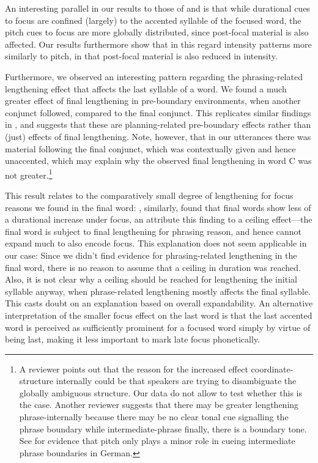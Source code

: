 \documentclass[preprint,review,12pt,authoryear,times]{elsarticle}
\begin{document}
An interesting parallel in our results to those of \citet{coope85} and \citet{eady86} is that while durational cues to focus are confined (largely) to the accented syllable of the focused word, the pitch cues to focus are more globally distributed, since post-focal material is also affected. Our results furthermore show that in this regard intensity patterns more similarly to pitch, in that post-focal material is also reduced in intensity.

Furthermore, we observed an interesting pattern regarding the phrasing-related lengthening effect that affects the last syllable of a word. We found a much greater effect of final lengthening in pre-boundary environments, when another conjunct followed, compared to the final conjunct. This replicates similar findings in \citet{wagner05recursion}, and suggests that these are planning-related pre-boundary effects rather than (just) effects of final lengthening. Note, however, that in our utterances there was material following the final conjunct, which was contextually given and hence unaccented, which may explain why the observed final lengthening in word C was not greater.\footnote{A reviewer points out that the reason for the increased effect coordinate-structure internally could be that speakers are trying to disambiguate the globally ambiguous structure. Our data do not allow to test whether this is the case. Another reviewer suggests that there may be greater lengthening phrase-internally because there may be no clear tonal cue signalling the phrase boundary while intermediate-phrase finally, there is a boundary tone. See \citet{gollr13} for evidence that pitch only plays a minor role in cueing intermediate phrase boundaries in German.} 

This result relates to the comparatively small degree of lengthening for focus reasons we found in the final word: \citet{coope85}, similarly,  found that final words show less of a durational increase under focus, an attribute this finding to a ceiling effect---the final word is subject to final lengthening for phrasing reason, and hence cannot expand much to also encode focus. This explanation does not seem applicable in our case:  Since we didn't find evidence for phrasing-related  lengthening in the final word, there is no reason to assume that a ceiling in duration was reached. Also, it is not clear why a ceiling should be reached for lengthening the initial syllable anyway, when phrase-related lengthening mostly affects the final syllable. This casts doubt on an explanation based on overall expandability. An alternative interpretation of the smaller focus effect on the last word is that the last accented word is perceived as sufficiently prominent for a focused word simply by virtue of being last, making it less important to mark late focus phonetically. 
\end{document}

